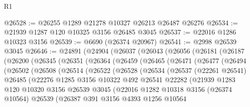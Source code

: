 \begin{lexlean}{R1}
\begin{coremodule}
@26528 := @26255 @1289 @21278 @10327 @26213 @26487 @26276
@26534 := @21939 @1287 @120 @10325 @3156 @26485 @3045
@26537 := @22016 @1286 @10323 @3156
@26539 := @6690 (@26374 @20967)
@26541 := @2998 @26539 @3045
@26646 := @24891
    (@24904
      (@26037
        (@26043
          (@26056
            (@26181
              (@26187
                (@26200
                  (@26345
                    (@26351
                      (@26364
                        (@26459
                          (@26465
                            (@26471
                              (@26477
                                (@26494
                                  (@26502
                                    (@26508
                                      (@26514
                                        (@26522
                                          (@26528
                                            (@26534
                                              (@26537
                                                (@22261 @26541)
                                                @26485
                                                (@22276
                                                  @1285
                                                  @3156
                                                  @10322
                                                  @492
                                                  @26541
                                                  @22282
                                                  (@21939
                                                    @1283
                                                    @120
                                                    @10320
                                                    @3156
                                                    @26539
                                                    @3045
                                                    (@22016
                                                      @1282
                                                      @10318
                                                      @3156
                                                      (@26374 @10564)
                                                      @26539
                                                      (@26387
                                                        @391
                                                        @3156
                                                        @4393
                                                        @1256
                                                        @10564

\end{coremodule}
\end{lexlean}
